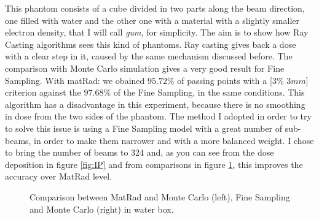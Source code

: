 \documentclass[12pt, a4paper, twoside]{book}
\begin{document}
This phantom consists of a cube divided in two parts along the beam direction, one filled with water and the other one with a material with a slightly smaller electron density, that I will call \emph{gum}, for simplicity.
The aim is to show how Ray Casting algorithms sees this kind of phantoms.
Ray casting gives back a dose with a clear step in it, caused by the same mechanism discussed before. The comparison with Monte Carlo simulation gives a very good result for Fine Sampling. With matRad: we obained $95.72\%$ of passing points with a [$3\%$ $3mm$] criterion against the $97.68\%$ of the Fine Sampling, in the same conditions. This algorithm has a disadvantage in this experiment, because there is no smoothing in dose from the two sides of the phantom. The method I adopted in order to try to solve this issue is using a Fine Sampling model with a great number of sub-beams, in order to make them narrower and with a more balanced weight. I chose to bring the number of beams to 324 and, as you can see from the dose deposition in figure \ref{fig:IP} and from comparisons in figure \ref{fig:IPgam}, this improves the accuracy over MatRad level.
\begin{figure}[!ht]
\centering
{} 
\caption{Comparison between MatRad and Monte Carlo (left), Fine Sampling and Monte Carlo (right) in water box.}
\label{fig:IPgam}
\end{figure}
\end{document}
